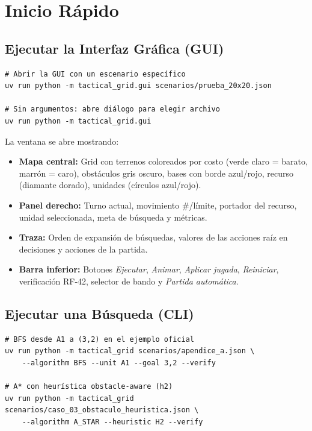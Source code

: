 \chapter{Inicio Rápido}
\label{man:inicio}

\section{Ejecutar la Interfaz Gráfica (GUI)}
\label{sec:gui-inicio}

\begin{verbatim}
# Abrir la GUI con un escenario específico
uv run python -m tactical_grid.gui scenarios/prueba_20x20.json

# Sin argumentos: abre diálogo para elegir archivo
uv run python -m tactical_grid.gui
\end{verbatim}

La ventana se abre mostrando:
\begin{itemize}
\item \textbf{Mapa central:} Grid con terrenos coloreados por costo (verde claro = barato, marrón = caro), obstáculos gris oscuro, bases con borde azul/rojo, recurso (diamante dorado), unidades (círculos azul/rojo).
\item \textbf{Panel derecho:} Turno actual, movimiento \#/límite, portador del recurso, unidad seleccionada, meta de búsqueda y métricas.
\item \textbf{Traza:} Orden de expansión de búsquedas, valores de las acciones raíz en decisiones y acciones de la partida.
\item \textbf{Barra inferior:} Botones \textit{Ejecutar}, \textit{Animar}, \textit{Aplicar jugada}, \textit{Reiniciar}, verificación RF-42, selector de bando y \textit{Partida automática}.
\end{itemize}

\section{Ejecutar una Búsqueda (CLI)}
\label{sec:cli-busqueda}

\begin{verbatim}
# BFS desde A1 a (3,2) en el ejemplo oficial
uv run python -m tactical_grid scenarios/apendice_a.json \
    --algorithm BFS --unit A1 --goal 3,2 --verify

# A* con heurística obstacle-aware (h2)
uv run python -m tactical_grid scenarios/caso_03_obstaculo_heuristica.json \
    --algorithm A_STAR --heuristic H2 --verify
\end{verbatim}

